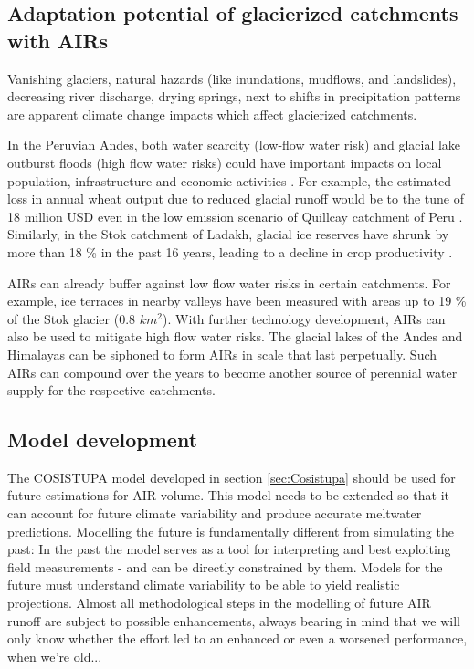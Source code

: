 \subsection{Adaptation potential of glacierized catchments with AIRs}

Vanishing glaciers, natural hazards (like inundations, mudflows, and landslides), decreasing river discharge,
drying springs, next to shifts in precipitation patterns are apparent climate change impacts which affect
glacierized catchments.

In the Peruvian Andes, both water scarcity (low-flow water risk) and glacial lake outburst floods (high flow
water risks) could have important impacts on local population, infrastructure and economic activities
\citep{motschmannIntegratedAssessmentsWater2020}. For example, the estimated loss in annual wheat output due to
reduced glacial runoff would be to the tune of 18 million USD even in the low emission scenario of Quillcay catchment
of Peru \citep{motschmannLossesDamagesConnected2020}. Similarly, in the Stok catchment of Ladakh, glacial ice
reserves have shrunk by more than 18 \% in the past 16 years, leading to a decline in crop productivity
\citep{sohebSpatiotemporalQuantificationKey2022}.

AIRs can already buffer against low flow water risks in certain catchments. For example, ice
terraces in nearby valleys have been measured with areas up to 19 \% of the Stok glacier (0.8 $km^2$). With further technology
development, AIRs can also be used to mitigate high flow water risks. The glacial lakes of the Andes and
Himalayas can be siphoned to form AIRs in scale that last perpetually. Such AIRs can compound over the years to
become another source of perennial water supply for the respective catchments.


\subsection{Model development}

The COSISTUPA model developed in section \ref{sec:Cosistupa} should be used for future estimations for AIR
volume. This model needs to be extended so that it can account for future climate variability and produce
accurate meltwater predictions. Modelling the future is fundamentally different from simulating the past: In the
past the model serves as a tool for interpreting and best exploiting field measurements - and can be directly
constrained by them. Models for the future must understand climate variability to be able to yield realistic
projections. Almost all methodological steps in the modelling of future AIR runoff are subject to possible
enhancements, always bearing in mind that we will only know whether the effort led to an enhanced or even a
worsened performance, when we're old...

